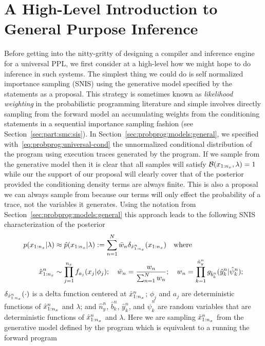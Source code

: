 
\section{A High-Level Introduction to General Purpose Inference}
\label{sec:proginf:high}

Before getting into the nitty-gritty of designing a compiler and inference engine for a universal PPL, we
first consider at a high-level how we might hope to do inference in such systems.  The simplest
thing we could do is self normalized importance sampling (SNIS) using the generative model specified by the \sample
statements as a proposal.  This strategy is sometimes known as \emph{likelihood weighting} in the probabilistic
programming literature and simple involves directly sampling from the forward model an accumulating
weights from the \observe conditioning statements in a sequential importance sampling fashion (see 
Section~\ref{sec:part:smc:sis}).
In Section~\ref{sec:probprog:models:general}, we specified with~\eqref{eq:probprog:universal-cond}
the unnormalized conditional distribution of the program using execution traces generated
by the program.  If we sample from the generative model then it is clear that all samples will satisfy
$\mathcal{B}(x_{1:n_x},\lambda)=1$ while our the support of our proposal will clearly cover that of
the posterior provided the conditioning density terms are always finite.  This is also a proposal
we can always sample from because our \observe terms will only effect the probability of a trace, not
the variables it generates.  Using the notation from Section~\ref{sec:probprog:models:general} 
this approach leads to the following SNIS characterization of the posterior
\begin{align}
p(x_{1:n_x} | \lambda) &\approx \hat{p}(x_{1:n_x} | \lambda) := \sum_{n=1}^{N} \bar w_n \delta_{\hat{x}_{1:n_x}^n} (x_{1:n_x})
\quad \text{where}  \\
\hat{x}_{1:n_x}^n &\sim \prod_{j=1}^{n_x} f_{a_j}(x_j | \phi_j); \quad \bar w_n = \frac{w_n}{\sum_{n=1}^{N} w_n}; \quad
w_n = \prod_{k=1}^{\hat{n}_{y}^n} g_{\hat{b}_{k}^n}(\hat{y}_{k}^n | \hat{\psi}_{k}^n);
\end{align}
$\delta_{\hat{x}_{1:n_x}^n} (\cdot)$ is a delta function centered at $\hat{x}_{1:n_x}^n$; $\phi_j$ and $a_j$ are deterministic functions of $\hat{x}_{1:n_x}^n$ 
and $\lambda$; and $\hat{n}_{y}^n$, $\hat{b}_{k}^n$, $\hat{y}_{k}^n$, and $\hat{\psi}_{k}^n$ are random variables
that are deterministic functions of $\hat{x}_{1:n_x}^n$ and $\lambda$.  Here we are sampling $\hat{x}_{1:n_x}^n$ from
the generative model defined by the program which is equivalent to a running the forward program
